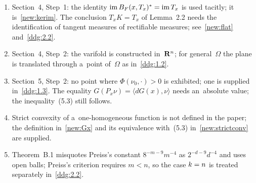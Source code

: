 \documentclass[a4paper,twoside,leqno]{article}
\begin{document}
\begin{remark}
\begin{enumerate}
        \item Section~4, Step~1: the identity $\operatorname{im} B_F(x,T_x)^{*} = \operatorname{im} T_x$ is used
        tacitly; it is~\ref{new:kerim}. The conclusion $T_x K = T_x$ of Lemma~2.2 needs the
        identification of tangent measures of rectifiable measures; see~\ref{new:flat}
        and~\ref{ddg:2.2}.
        \item Section~4, Step~2: the varifold is constructed in~$\mathbf{R}^n$; for general~$\Omega$ the
        plane is translated through a~point of~$\Omega$ as in~\ref{ddg:1.2}.
        \item Section~5, Step~2: no point where $\Phi(\nu_0,\cdot) > 0$ is exhibited; one is
        supplied in~\ref{ddg:1.3}. The equality $G(P_x \nu) = \langle d G(x), \nu \rangle$ needs
        an~absolute value; the inequality~(5.3) still follows.
        \item Strict convexity of a~one-homogeneous function is not defined in the paper; the
        definition in~\ref{new:Gx} and its equivalence with~(5.3) in~\ref{new:strictconv} are
        supplied.
        \item Theorem~B.1 misquotes Preiss's constant $8^{-m-9} m^{-4}$ as $2^{-d-9} d^{-4}$ and
        uses open balls; Preiss's criterion requires $m < n$, so the case $k = n$ is
        treated separately in~\ref{ddg:2.2}.
    \end{enumerate}
\end{remark}



\end{document}
